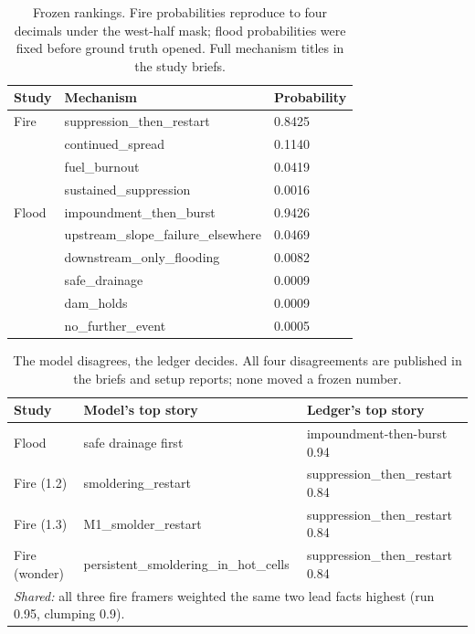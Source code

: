\documentclass[11pt]{article}
\begin{document}
\begin{table}[t]
\centering
\caption{Frozen rankings. Fire probabilities reproduce to four decimals under
the west-half mask; flood probabilities were fixed before ground truth
opened. Full mechanism titles in the study briefs.}
\label{tab:rankings}
\begin{tabular}{lll}
\toprule
Study & Mechanism & Probability \\
\midrule
Fire & suppression\_then\_restart & 0.8425 \\
     & continued\_spread & 0.1140 \\
     & fuel\_burnout & 0.0419 \\
     & sustained\_suppression & 0.0016 \\
\midrule
Flood & impoundment\_then\_burst & 0.9426 \\
      & upstream\_slope\_failure\_elsewhere & 0.0469 \\
      & downstream\_only\_flooding & 0.0082 \\
      & safe\_drainage & 0.0009 \\
      & dam\_holds & 0.0009 \\
      & no\_further\_event & 0.0005 \\
\bottomrule
\end{tabular}
\end{table}

\begin{table}[t]
\centering
\caption{The model disagrees, the ledger decides. All four disagreements are
published in the briefs and setup reports; none moved a frozen number.}
\label{tab:llm}
\footnotesize
\begin{tabular}{lll}
\toprule
Study & Model's top story & Ledger's top story \\
\midrule
Flood & safe drainage first & impoundment-then-burst 0.94 \\
Fire (1.2) & smoldering\_restart & suppression\_then\_restart 0.84 \\
Fire (1.3) & M1\_smolder\_restart & suppression\_then\_restart 0.84 \\
Fire (wonder) & persistent\_smoldering\_in\_hot\_cells & suppression\_then\_restart 0.84 \\
\multicolumn{3}{l}{\emph{Shared:} all three fire framers weighted the same two lead facts
highest (run 0.95, clumping 0.9).} \\
\bottomrule
\end{tabular}
\normalsize
\end{table}
\end{document}
